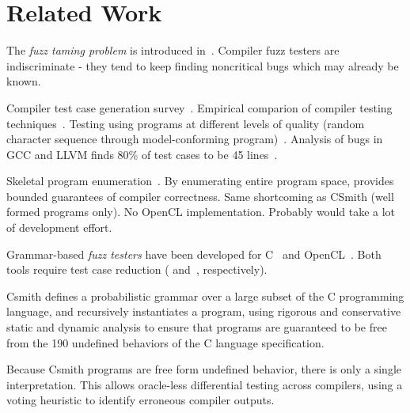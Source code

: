 \section{Related Work}\label{sec:rw}


The \emph{fuzz taming problem} is introduced in~\cite{Chen2013}. Compiler fuzz testers are indiscriminate - they tend to keep finding noncritical bugs which may already be known.

 Compiler test case generation survey~\cite{Boujarwah1997}. Empirical comparion of compiler testing techniques~\cite{Chen2014a}. Testing using programs at different levels of quality (random character sequence through model-conforming program)~\cite{McKeeman1998}. Analysis of bugs in GCC and LLVM finds 80\% of test cases to be 45 lines~\cite{Sun2016}.

Skeletal program enumeration~\cite{Zhang2016a}. By enumerating entire program space, provides bounded guarantees of compiler correctness. Same shortcoming as CSmith (well formed programs only). No OpenCL implementation. Probably would take a lot of development effort. 

Grammar-based \emph{fuzz testers} have been developed for C~\cite{Yang2011} and OpenCL~\cite{Lidbury2015a}. Both tools require test case reduction (\cite{Regehr2012a} and~\cite{Pflanzer2016}, respectively).

Csmith defines a probabilistic grammar over a large subset of the C programming language, and recursively instantiates a program, using rigorous and conservative static and dynamic analysis to ensure that programs are guaranteed to be free from the 190 undefined behaviors of the C language specification.

Because Csmith programs are free form undefined behavior, there is only a single interpretation. This allows oracle-less differential testing across compilers, using a voting heuristic to identify erroneous compiler outputs.

